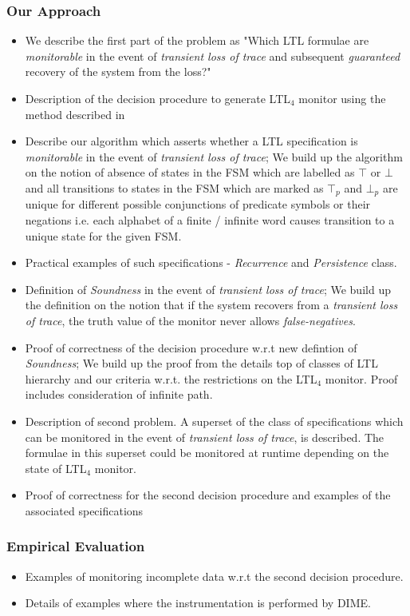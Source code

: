 \documentclass[]{article}
\newcommand{\tloss}{\emph{transient loss of trace}}
\begin{document}
			\subsubsection{Our Approach}
				\begin{itemize}
					\item We describe the first part of the problem as "Which LTL formulae are \emph{monitorable} in the event of \tloss{} and subsequent \emph{guaranteed} recovery of the system from the loss?"
					\item Description of the decision procedure to generate LTL$_4$ monitor using the method described in \cite{RefWorks:10}
					\item Describe our algorithm which asserts whether a LTL specification is \emph{monitorable} in the event of \tloss{}; We build up the algorithm on the notion of absence of states in the FSM which are labelled as $\top$ or $\bot$ and all transitions to states in the FSM which are marked as $\top_p$ and $\bot_p$  are unique for different possible conjunctions of predicate symbols or their negations i.e. each alphabet of a finite / infinite word causes transition to a unique state for the given FSM.
					\item Practical examples of such specifications - \emph{Recurrence} and \emph{Persistence} class.
					\item Definition of \emph{Soundness} in the event of \tloss{}; We build up the definition on the notion that if the system recovers from a \tloss{}, the truth value of the monitor never allows \emph{false-negatives}.
					\item Proof of correctness of the decision procedure w.r.t new defintion of \emph{Soundness}; We build up the proof from the details top of classes of LTL hierarchy and our criteria w.r.t. the restrictions on the LTL$_4$ monitor. Proof includes consideration of infinite path.
					\item Description of second problem. A superset of the class of specifications which can be monitored in the event of \tloss{}, is described. The formulae in this superset could be monitored at runtime depending on the state of LTL$_4$ monitor.
					\item Proof of correctness for the second decision procedure and examples of the associated specifications
					
				\end{itemize}
			\subsubsection{Empirical Evaluation}	
				\begin{itemize}
					\item Examples of monitoring incomplete data w.r.t the second decision procedure.
					\item Details of examples where the instrumentation is performed by DIME.
				\end{itemize}
\end{document}
